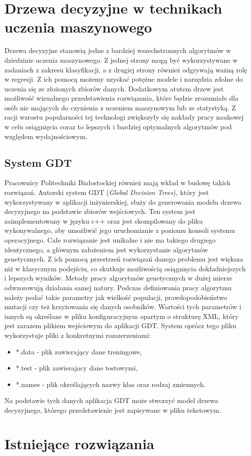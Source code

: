 \section{Drzewa decyzyjne w technikach uczenia maszynowego}

Drzewa decyzyjne stanowią jedne z bardziej wszechstronnych algorytmów w  dziedzinie uczenia maszynowego. Z jednej strony mogą być wykorzystywane w zadaniach z zakresu klasyfikacji, a z drugiej strony również odgrywają ważną rolę w regresji.\cite{book_1} Z ich pomocą możemy uzyskać potężne modele i narzędzia zdolne do uczenia się ze złożonych zbiorów danych. Dodatkowym atutem drzew jest możliwość wizualnego przedstawienia rozwiązania, które będzie zrozumiałe dla osób nie mających do czynienia z uczeniem maszynowym lub ze statystyką. Z racji wzrostu popularności tej technologi zwiększyły się nakłady pracy naukowej w celu osiągnięcia coraz to lepszych i bardziej optymalnych algorytmów pod względem wydajnościowym. 

\subsection{System GDT}
Pracownicy Politechniki Białostockiej również mają wkład w budowę takich rozwiązań. Autorski system GDT (\textit{Global Decision Trees}), który jest wykorzystywany w aplikacji inżynierskiej, służy do generowania modelu drzewa decyzyjnego na podstawie zbiorów wejściowych. Ten system jest zaimplementowany w języku c++ oraz jest skompilowany do pliku wykonywalnego, aby umożliwić jego uruchomianie z poziomu konsoli systemu operacyjnego. Całe rozwiązanie jest unikalne i nie ma takiego drugiego identycznego, a głównym założeniem jest wykorzystanie algorytmów genetycznych. Z ich pomocą przestrzeń rozwiązań danego problemu jest większa niż w klasycznym podejściu, co skutkuje możliwością osiągnięcia dokładniejszych i lepszych wyników. Metody pracy algorytmów genetycznych w dużej mierze odwzorowują działania samej natury.\cite{book_2} Podczas definiowania pracy algorytmu należy podać takie parametry jak wielkość populacji, prawdopodobieństwo mutacji czy też krzyżowania się danych osobników. Wartości tych parametrów i innych są określane w pliku konfiguracyjnym opartym o strukturę XML, który jest zarazem plikiem wejściowym do aplikacji GDT. System oprócz tego pliku wykorzystuje pliki z konkretnymi rozszerzeniami:
\begin{itemize}
	\item *.data - plik zawierający dane treningowe, 
	\item *.test - plik zawierajacy dane testowymi,
	\item *.names - plik określających nazwy klas oraz rodzaj zmiennych.
\end{itemize}
Na podstawie tych danych aplikacja GDT może stworzyć model drzewa decyzyjnego, którego przedstawienie jest zapisywane w pliku tekstowym. 

\section{Istniejące rozwiązania}